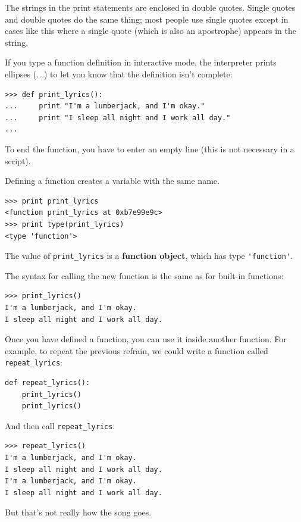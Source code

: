 \documentclass[10pt]{book}
\begin{document}
The strings in the print statements are enclosed in double
quotes.  Single quotes and double quotes do the same thing;
most people use single quotes except in cases like this where
a single quote (which is also an apostrophe) appears in the string.


If you type a function definition in interactive mode, the interpreter
prints ellipses ({\em ...}) to let you know that the definition
isn't complete:

\beforeverb
\begin{verbatim}
>>> def print_lyrics():
...     print "I'm a lumberjack, and I'm okay."
...     print "I sleep all night and I work all day."
...
\end{verbatim}
\afterverb
%
To end the function, you have to enter an empty line (this is
not necessary in a script).

Defining a function creates a variable with the same name.

\beforeverb
\begin{verbatim}
>>> print print_lyrics
<function print_lyrics at 0xb7e99e9c>
>>> print type(print_lyrics)
<type 'function'>
\end{verbatim}
\afterverb
%
The value of \verb"print_lyrics" is a {\bf function object}, which
has type \verb"'function'".


The syntax for calling the new function is the same as
for built-in functions:

\beforeverb
\begin{verbatim}
>>> print_lyrics()
I'm a lumberjack, and I'm okay.
I sleep all night and I work all day.
\end{verbatim}
\afterverb
%
Once you have defined a function, you can use it inside another
function.  For example, to repeat the previous refrain, we could write
a function called \verb"repeat_lyrics":

\beforeverb
\begin{verbatim}
def repeat_lyrics():
    print_lyrics()
    print_lyrics()
\end{verbatim}
\afterverb
%
And then call \verb"repeat_lyrics":

\beforeverb
\begin{verbatim}
>>> repeat_lyrics()
I'm a lumberjack, and I'm okay.
I sleep all night and I work all day.
I'm a lumberjack, and I'm okay.
I sleep all night and I work all day.
\end{verbatim}
\afterverb
%
But that's not really how the song goes.
\end{document}
